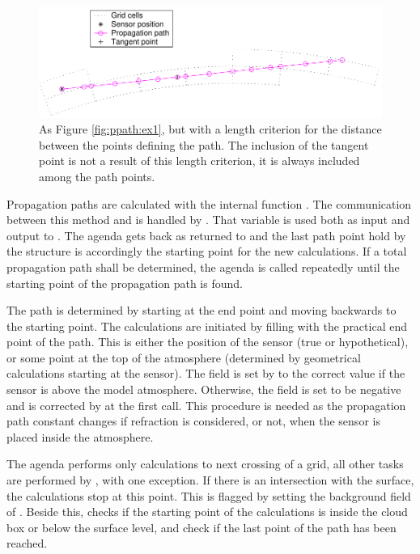 \begin{figure}
 \begin{center}
   \includegraphics*[width=0.98\hsize]{ppath_ex2}
  \caption{As Figure \ref{fig:ppath:ex1}, but with a length criterion 
    for the distance between the points defining the path.
    The inclusion of the tangent point is not a result of this length
    criterion, it is always included among the path points.}
  \label{fig:ppath:ex2}  
 \end{center}
\end{figure}


Propagation paths are calculated with the internal function
. The communication between this method and
 is handled by .
That variable is used both as input and output to
.  The agenda gets back
 as returned to  and the
last path point hold by the structure is accordingly the starting
point for the new calculations. If a total propagation path shall be
determined, the agenda is called repeatedly until the starting point
of the propagation path is found. 

The path is determined by starting at the end point and moving
backwards to the starting point. The calculations are initiated by
filling  with the practical end point of the
path. This is either the position of the sensor (true or
hypothetical), or some point at the top of the atmosphere (determined
by geometrical calculations starting at the sensor).
The field  is set by 
to the correct value if the sensor is above the model atmosphere.
Otherwise, the field is set to be negative and is corrected by
 at the first call. This procedure is
needed as the propagation path constant changes if refraction is
considered, or not, when the sensor is placed inside the atmosphere.

The agenda performs only calculations to next crossing of a grid, all
other tasks are performed by , with one exception.
If there is an intersection with the surface, the calculations stop at
this point. This is flagged by setting the background field of
. Beside this,  checks if
the starting point of the calculations is inside the cloud box or
below the surface level, and check if the last point of the path has
been reached. 


